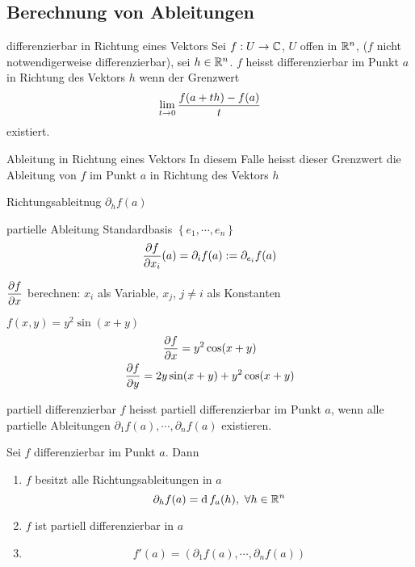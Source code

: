 \subsection{Berechnung von Ableitungen}
\begin{Def}{differenzierbar in Richtung eines Vektors}
  Sei $f:U\to\mathbb{C}$, $U$ offen in $\mathbb{R}^n$, ($f$ nicht notwendigerweise differenzierbar), sei $h\in\mathbb{R}^n$. $f$ heisst differenzierbar im Punkt $a$ in Richtung des Vektors $h$ wenn der Grenzwert
  \[\displaystyle\lim_{t\rightarrow0}\frac{f(a+th)-f(a)}{t}\]
  existiert.
\end{Def}
\begin{Def}{Ableitung in Richtung eines Vektors}
  In diesem Falle heisst dieser Grenzwert die Ableitung von $f$ im Punkt $a$ in Richtung des Vektors $h$
\end{Def}
\begin{Not}{Richtungsableitnug}
  $\partial_hf(a)$
\end{Not}
\begin{Not}{partielle Ableitung}
  Standardbasis $\left\{ e_1,\cdots,e_n \right\}$
  \[\dfrac{\partial f}{\partial x_i}(a)=\partial_if(a):=\partial_{e_i}f(a)\]
\end{Not}
\begin{Bem}
  $\dfrac{\partial f}{\partial x}$ berechnen: $x_i$ als Variable, $x_j$, $j\neq i$ als Konstanten
\end{Bem}
\begin{Bsp}
  $f(x,y)=y^2\sin(x+y)$
  \begin{gather*}
    \dfrac{\partial f}{\partial x}=y^2\cos(x+y)\\
    \dfrac{\partial f}{\partial y}=2y\sin(x+y)+y^2\cos(x+y)
  \end{gather*}
\end{Bsp}
\begin{Def}{partiell differenzierbar}
  $f$ heisst partiell differenzierbar im Punkt $a$, wenn alle partielle Ableitungen $\partial_1f(a),\cdots,\partial_nf(a)$ existieren.
\end{Def}
\begin{Sat}
  Sei $f$ differenzierbar im Punkt $a$. Dann
  \begin{enumerate}
    \item $f$ besitzt alle Richtungsableitungen in $a$
      \[\partial_hf(a)=\operatorname{d} f_a(h),\ \forall h\in\mathbb{R}^n\]
    \item $f$ ist partiell differenzierbar in $a$
    \item \[f'(a)=\left( \partial_1f(a),\cdots,\partial_nf(a) \right)\]
  \end{enumerate}
\end{Sat}
